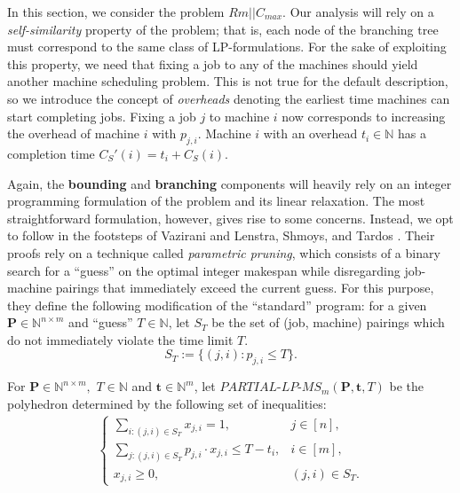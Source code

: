 \documentclass[a4paper,UKenglish,cleveref, autoref, thm-restate, pdfa]{lipics-v2021}
\newcommand{\N}{\mathbb{N}}
\theoremstyle{plain}
\begin{document}
In this section, we consider the problem $Rm||C_{max}$. Our analysis will rely on a \emph{self-similarity} property of the problem; that is, each node of the branching tree must correspond to the same class of LP-formulations. For the sake of exploiting this property, we need that fixing a job to any of the machines should yield another machine scheduling problem. This is not true for the default description, so we introduce the concept of \emph{overheads} denoting the earliest time machines can start completing jobs. Fixing a job $j$ to machine $i$ now corresponds to increasing the overhead of machine $i$ with $p_{j, i}$. Machine $i$ with an overhead $t_i \in \N$ has a completion time $C_S'(i)= t_i + C_S(i)$.

Again, the \textbf{bounding} and \textbf{branching} components will heavily rely on an integer programming formulation of the problem and its linear relaxation. The most straightforward formulation, however, gives rise to some concerns. Instead, we opt to follow in the footsteps of Vazirani \cite{vazirani} and Lenstra, Shmoys, and Tardos \cite{lenstra_shmoys_tardos}. Their proofs rely on a technique called \emph{parametric pruning}, which consists of a binary search for a ``guess'' on the optimal integer makespan while disregarding job-machine pairings that immediately exceed the current guess. For this purpose, they define the following modification of the ``standard'' program: for a given $\bm{P} \in \mathbb{N}^{n\times m}$ and ``guess'' $T \in \mathbb{N}$, let $S_T$ be the set of (job, machine) pairings which do not immediately violate the time limit $T$.
\[
S_T := \{(j,i): p_{j,i} \le T\}.
\]

\begin{definition}
    For $\bm{P} \in \mathbb{N}^{n\times m}, \,\, T \in \mathbb{N}$ and $\bm{t} \in \mathbb{N}^m$, let $PARTIAL\text{-}LP\text{-}MS_m(\bm{P}, \bm{t}, T)$ be the polyhedron determined by the following set of inequalities:
    \begin{align}\label{partial_machine_scheduling_lp}
        \begin{cases}
            \sum\limits_{i: (j,i) \in S_T} x_{j,i} = 1, & j\in [n], \\
            \sum\limits_{j: (j,i) \in S_T} p_{j,i} \cdot  x_{j,i} \le T-t_i, & i \in [m], \\
            x_{j,i} \ge 0, & (j,i) \in S_T.
        \end{cases}
    \end{align}
    \label{def:binary_search_poly}
\end{definition}
\end{document}
